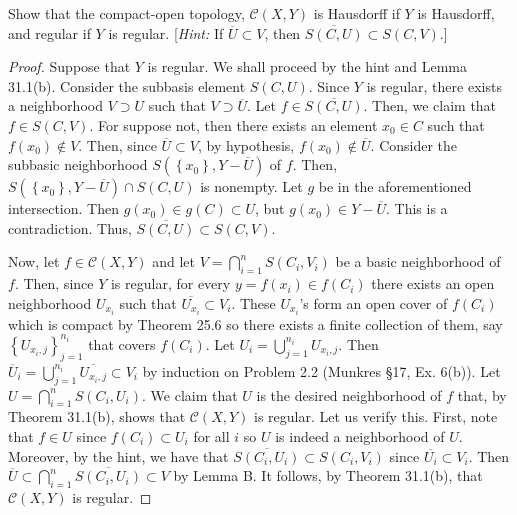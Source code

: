 \begin{problem}[Munkres \S46, Ex.\,6]
Show that the compact-open topology, $\mathcal{C}(X,Y)$ is
Hausdorff if $Y$ is Hausdorff, and regular if $Y$ is
regular. [\emph{Hint:} If $\overline U\subset V$, then
$\overline{S(C,U)}\subset S(C,V)$.]
\end{problem}
\begin{proof}
Suppose that $Y$ is regular. We shall proceed by the
hint and Lemma 31.1(b). Consider the subbasis element
$S(C,U)$. Since $Y$ is regular, there exists a neighborhood
$V\supset U$ such that $V\supset\overline{U}$. Let
$f\in\overline{S(C,U)}$. Then, we claim that $f\in S(C,V)$. For
suppose not, then there exists an element $x_0\in C$ such that
$f(x_0)\notin V$. Then, since $\overline{U}\subset V$, by
hypothesis, $f(x_0)\notin\overline{U}$. Consider the subbasic
neighborhood $S\left(\left\{x_0\right\},Y-\overline{U}\right)$ of
$f$. Then, $S\left(\left\{x_0\right\},Y-\overline{U}\right)\cap
S(C,U)$ is nonempty. Let $g$ be in the aforementioned
intersection. Then $g(x_0)\in g(C)\subset U$, but $g(x_0)\in
Y-\overline{U}$. This is a contradiction. Thus, $\overline{S(C,U)}\subset
S(C,V)$.

Now, let $f\in\mathcal{C}(X,Y)$ and let $V=\bigcap_{i=1}^n S(C_i,V_i)$ be a
basic neighborhood of $f$. Then, since $Y$ is regular, for every
$y=f(x_i)\in f(C_i)$ there exists an open neighborhood $U_{x_i}$ such that
$\overline{U_{x_i}}\subset V_i$. These $U_{x_i}$'s form an open cover of
$f(C_i)$ which is compact by Theorem 25.6 so there exists a finite
collection of them, say $\left\{U_{x_i,j}\right\}_{j=1}^{n_i}$ that covers
$f(C_i)$. Let $U_i=\bigcup_{j=1}^{n_i}U_{x_i,j}$. Then
$\overline{U}_i=\bigcup_{j=1}^{n_i}\overline{U_{x_i,j}}\subset V_i$ by
induction on Problem 2.2 (Munkres \S17, Ex. 6(b)). Let
$U=\bigcap_{i=1}^nS(C_i,U_i)$. We claim that $U$ is the desired
neighborhood of $f$ that, by Theorem 31.1(b), shows that $\mathcal{C}(X,Y)$
is regular. Let us verify this. First, note that $f\in U$ since
$f(C_i)\subset U_i$ for all $i$ so $U$ is indeed a neighborhood of
$U$. Moreover, by the hint, we have that $\overline{S(C_i,U_i)}\subset
S(C_i,V_i)$ since $\overline{U_i}\subset V_i$. Then
$\overline{U}\subset\bigcap_{i=1}^n\overline{S(C_i,U_i)}\subset V$ by Lemma
B. It follows, by Theorem 31.1(b), that $\mathcal{C}(X,Y)$ is regular.
\end{proof}
\newpage
